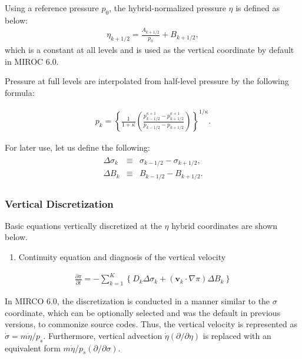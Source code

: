 Using a reference pressure \(p_0\), the hybrid-normalized pressure \(\eta\) is defined as below: \begin{eqnarray}
\eta_{k+1/2} = \frac{A_{k+1/2}}{p_0} +B_{k+1/2},  \end{eqnarray} which is a constant at all levels and is used as the vertical coordinate by default in MIROC 6.0.

Pressure at full levels are interpolated from half-level pressure by the following formula:

\begin{eqnarray}
p_k = \left\{ \frac{1}{1+\kappa}
\left( \frac{  p^{\kappa +1}_{k-1/2}
- p^{\kappa +1}_{k+1/2}      }
{ p_{k-1/2} - p_{k+1/2} }
\right)
\right\}^{1/\kappa}.
\end{eqnarray}

For later use, let us define the following: \begin{eqnarray}
\begin{aligned}
  \Delta\sigma_k &\equiv & \sigma_{k-1/2} - \sigma_{k+1/2}, \\
  \Delta B_k &\equiv & B_{k-1/2} - B_{k+1/2}. \end{aligned} \end{eqnarray}

\hypertarget{vertical-discretization-1}{%
\subsubsection{Vertical Discretization}\label{vertical-discretization-1}}

Basic equations vertically discretized at the \(\eta\) hybrid coordinates are shown below.

\begin{enumerate}
\def\labelenumi{\arabic{enumi}.}
\tightlist
\item
  Continuity equation and diagnosis of the vertical velocity
\end{enumerate}

\begin{eqnarray}
  \frac{\partial \pi}{\partial t}
 = - \sum_{k=1}^{K} \left\{ D_k \Delta\sigma_k + ({\mathbf{v}}_k \cdot \nabla \pi)\Delta B_k \right\}  \end{eqnarray}

In MIRCO 6.0, the discretization is conducted in a manner similar to the \(\sigma\) coordinate, which can be optionally selected and was the default in previous versions, to commonize source codes.
Thus, the vertical velocity is represented as \(\dot{\sigma}=m\dot{\eta}/p_s\). Furthermore, vertical advection \(\dot{\eta}(\partial/\partial\eta)\) is replaced with an equivalent form
\(m\dot{\eta}/p_s(\partial/\partial\sigma)\).

